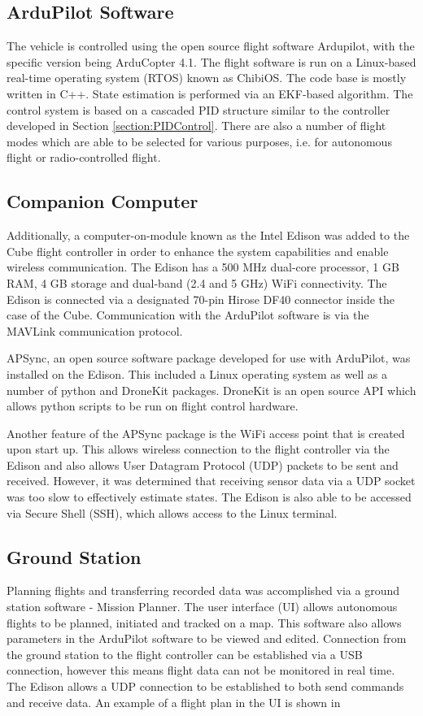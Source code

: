 \subsection{ArduPilot Software}
The vehicle is controlled using the open source flight software Ardupilot, with the specific version being ArduCopter 4.1. The flight software is run on a Linux-based real-time operating system (RTOS) known as ChibiOS. The code base is mostly written in C++. State estimation is performed via an EKF-based algorithm. The control system is based on a cascaded PID structure similar to the controller developed in Section \ref{section:PIDControl}. There are also a number of flight modes which are able to be selected for various purposes, i.e. for autonomous flight or radio-controlled flight.

\subsection{Companion Computer}
Additionally, a computer-on-module known as the Intel Edison was added to the Cube flight controller in order to enhance the system capabilities and enable wireless communication. The Edison has a 500 MHz dual-core processor, 1 GB RAM, 4 GB storage and dual-band (2.4 and 5 GHz) WiFi connectivity. The Edison is connected via a designated 70-pin Hirose DF40 connector inside the case of the Cube. Communication with the ArduPilot software is via the MAVLink communication protocol.

APSync, an open source software package developed for use with ArduPilot, was installed on the Edison. This included a Linux operating system as well as a number of python and DroneKit packages. DroneKit is an open source API which allows python scripts to be run on flight control hardware. 

Another feature of the APSync package is the WiFi access point that is created upon start up. This allows wireless connection to the flight controller via the Edison and also allows User Datagram Protocol (UDP) packets to be sent and received. However, it was determined that receiving sensor data via a UDP socket was too slow to effectively estimate states. The Edison is also able to be accessed via Secure Shell (SSH), which allows access to the Linux terminal.



\subsection{Ground Station}
Planning flights and transferring recorded data was accomplished via a ground station software - Mission Planner. The user interface (UI) allows autonomous flights to be planned, initiated and tracked on a map. This software also allows parameters in the ArduPilot software to be viewed and edited. Connection from the ground station to the flight controller can be established via a USB connection, however this means flight data can not be monitored in real time. The Edison allows a UDP connection to be established to both send commands and receive data. An example of a flight plan in the UI is shown in 

